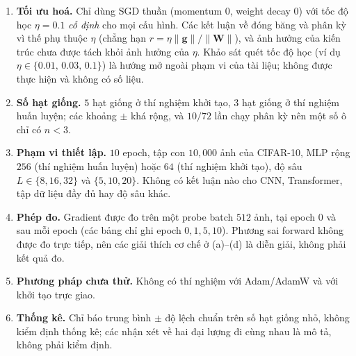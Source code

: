 \begin{enumerate}[leftmargin=*, itemsep=2pt, label=(\arabic*)]
  \item \textbf{Tối ưu hoá.} Chỉ dùng SGD thuần (momentum $0$, weight decay $0$) với tốc độ học
    $\eta=0.1$ \emph{cố định} cho mọi cấu hình. Các kết luận về đóng băng và phân kỳ vì thế phụ thuộc
    $\eta$ (chẳng hạn $r=\eta\|\mathbf{g}\|/\|\mathbf{W}\|$), và ảnh hưởng của kiến trúc chưa được tách khỏi ảnh
    hưởng của $\eta$. Khảo sát quét tốc độ học (ví dụ $\eta\in\{0.01,\,0.03,\,0.1\}$) là hướng mở
    ngoài phạm vi của tài liệu; không được thực hiện và không có số liệu.
  \item \textbf{Số hạt giống.} $5$ hạt giống ở thí nghiệm khởi tạo, $3$ hạt giống ở thí nghiệm huấn
    luyện; các khoảng $\pm$ khá rộng, và $10/72$ lần chạy phân kỳ nên một số ô chỉ có $n<3$.
  \item \textbf{Phạm vi thiết lập.} $10$ epoch, tập con $10{,}000$ ảnh của CIFAR-10, MLP rộng $256$
    (thí nghiệm huấn luyện) hoặc $64$ (thí nghiệm khởi tạo), độ sâu $L\in\{8,16,32\}$ và $\{5,10,20\}$.
    Không có kết luận nào cho CNN, Transformer, tập dữ liệu đầy đủ hay độ sâu khác.
  \item \textbf{Phép đo.} Gradient được đo trên một probe batch $512$ ảnh, tại epoch $0$ và sau mỗi
    epoch (các bảng chỉ ghi epoch $0,1,5,10$). Phương sai forward không được đo trực tiếp, nên các giải
    thích cơ chế ở (a)--(d) là diễn giải, không phải kết quả đo.
  \item \textbf{Phương pháp chưa thử.} Không có thí nghiệm với Adam/AdamW và với khởi tạo trực giao.
  \item \textbf{Thống kê.} Chỉ báo trung bình $\pm$ độ lệch chuẩn trên số hạt giống nhỏ, không kiểm định
    thống kê; các nhận xét về hai đại lượng đi cùng nhau là mô tả, không phải kiểm định.
\end{enumerate}

